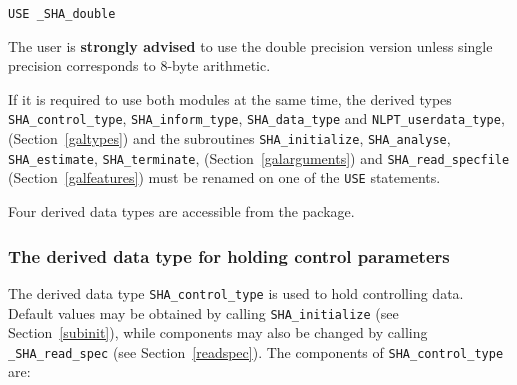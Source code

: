 \documentclass{galahad}
\newcommand{\packagename}{SHA}
\newcommand{\fullpackagename}{\libraryname\_\packagename}
\begin{document}
\hspace{8mm} {\tt USE  \fullpackagename\_double}

\medskip

\noindent
The user is {\bf strongly advised} to use the double
precision version unless single precision corresponds to 8-byte arithmetic.

If it is required to use both modules at the same time, the derived types 
{\tt \packagename\_control\_type}, 
{\tt \packagename\_inform\_type},
{\tt \packagename\_data\_type}
and
{\tt NLPT\_userdata\_type},
(Section~\ref{galtypes})
and the subroutines
{\tt \packagename\_initialize}, 
{\tt \packagename\_\-analyse},
{\tt \packagename\_\-estimate},
{\tt \packagename\_terminate},
(Section~\ref{galarguments})
and 
{\tt \packagename\_read\_specfile}
(Section~\ref{galfeatures})
must be renamed on one of the {\tt USE} statements.


\galtypes
Four derived data types are accessible from the package.


\subsubsection{The derived data type for holding control 
 parameters}\label{typecontrol}
The derived data type 
{\tt \packagename\_control\_type} 
is used to hold controlling data. Default values may be obtained by calling 
{\tt \packagename\_initialize}
(see Section~\ref{subinit}),
while components may also be changed by calling 
{\tt \fullpackagename\_read\-\_spec}
(see Section~\ref{readspec}). 
The components of 
{\tt \packagename\_control\_type} 
are:
\end{document}
